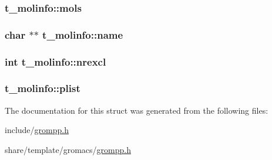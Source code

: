 \hypertarget{structt__molinfo_ac24246ac0b771751d2c02aa282625008}{
\subsubsection[{mols}]{ {\bf t\-\_\-molinfo\-::mols}}}\label{structt__molinfo_ac24246ac0b771751d2c02aa282625008}
\hypertarget{structt__molinfo_a4fd8705afd65d26665217edd90ebe33d}{
\subsubsection[{name}]{\setlength{\rightskip}{0pt plus 5cm}char $\ast$$\ast$ {\bf t\-\_\-molinfo\-::name}}}\label{structt__molinfo_a4fd8705afd65d26665217edd90ebe33d}
\hypertarget{structt__molinfo_a1f23558de0275f615d9d5d344c453023}{
\subsubsection[{nrexcl}]{\setlength{\rightskip}{0pt plus 5cm}int {\bf t\-\_\-molinfo\-::nrexcl}}}\label{structt__molinfo_a1f23558de0275f615d9d5d344c453023}
\hypertarget{structt__molinfo_a9f8cfe4b08ca7a22a22ba340a078cf97}{
\subsubsection[{plist}]{ {\bf t\-\_\-molinfo\-::plist}}}\label{structt__molinfo_a9f8cfe4b08ca7a22a22ba340a078cf97}


\-The documentation for this struct was generated from the following files\-:\begin{DoxyCompactItemize}
\item 
include/\hyperlink{include_2grompp_8h}{grompp.\-h}\item 
share/template/gromacs/\hyperlink{share_2template_2gromacs_2grompp_8h}{grompp.\-h}\end{DoxyCompactItemize}
